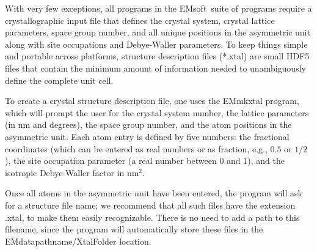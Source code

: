 \documentclass[DIV=calc, paper=letter, fontsize=11pt]{scrartcl}	 %
\newcommand{\ctp}{\textsf{EMsoft}}
\begin{document}
With very few exceptions, all programs in the \ctp\ suite of programs require a crystallographic input file that defines the 
crystal system, crystal lattice parameters, space group number, and all unique positions in the 
asymmetric unit along with site occupations and Debye-Waller parameters.  To keep things simple and 
portable across platforms, structure description files (*.xtal) are small HDF5 files that contain the minimum
amount of information needed to unambiguously define the complete unit cell.  

To create a crystal structure description file, one uses the \textsf{EMmkxtal} program, which will prompt
the user for the crystal system number, the lattice parameters (in nm and degrees), the space group number,
and the atom positions in the asymmetric unit.  Each atom entry is defined by five numbers: the fractional
coordinates (which can be entered as real numbers or as fraction, e.g., $0.5$ or $1/2$), the site 
occupation parameter (a real number between $0$ and $1$), and the isotropic Debye-Waller factor in nm$^{2}$.

Once all atoms in the asymmetric unit have been entered, the program will ask for a structure file name; we
recommend that all such files have the extension \textsf{.xtal}, to make them easily recognizable.  There is no
need to add a path to this filename, since the program will automatically store these files in the EMdatapathname/XtalFolder
location.
\end{document}
